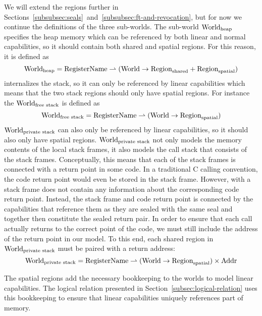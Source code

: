 \begin{jversion}
We will extend the regions further in Sections~\ref{subsubsec:seals}~and~\ref{subsubsec:ft-and-revocation}, but for now we continue the definitions of the three sub-worlds.
The sub-world $\mathrm{World}_\mathrm{heap}$ specifies the heap memory which can be referenced by both linear and normal capabilities, so it should contain both shared and spatial regions.
For this reason, it is defined as
\[
  \mathrm{World}_\mathrm{heap} = \mathrm{RegisterName} \rightharpoonup (\mathrm{World} \rightarrow \mathrm{Region}_\mathrm{shared} + \mathrm{Region}_\mathrm{spatial})
\]
\srccm{} internalizes the \stktokens{} stack, so it can only be referenced by linear capabilities which means that the two stack regions should only have spatial regions.
For instance the $\mathrm{World}_\text{free stack}$ is defined as
\[
  \mathrm{World}_\text{free stack} = \mathrm{RegisterName} \rightharpoonup (\mathrm{World} \rightarrow \mathrm{Region}_\mathrm{spatial})
\]
$\mathrm{World}_\text{private stack}$ can also only be referenced by linear capabilities, so it should also only have spatial regions.
$\mathrm{World}_\text{private stack}$ not only models the memory contents of the local stack frames, it also models the call stack that consists of the stack frames.
Conceptually, this means that each of the stack frames is connected with a return point in some code.
In a traditional C calling convention, the code return point would even be stored in the stack frame.
However, with \stktokens{} a stack frame does not contain any information about the corresponding code return point.
Instead, the stack frame and code return point is connected by the capabilities that reference them as they are sealed with the same seal and together then constitute the sealed return pair.
In order to ensure that each call actually returns to the correct point of the code, we must still include the address of the return point in our model.
To this end, each shared region in $\mathrm{World}_\text{private stack}$ must be paired with a return address:
\[
\mathrm{World}_\text{private stack} = \mathrm{RegisterName} \rightharpoonup (\mathrm{World} \rightarrow \mathrm{Region}_\mathrm{spatial}) \times \mathrm{Addr} 
\]

The spatial regions add the necessary bookkeeping to the worlds to model linear capabilities.
The logical relation presented in Section~\ref{subsec:logical-relation} uses this bookkeeping to ensure that linear capabilities uniquely references part of memory.


\end{jversion}
